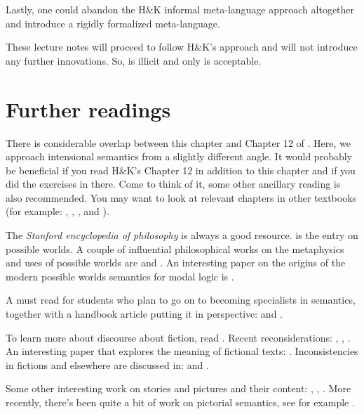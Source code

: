 Lastly, one could abandon the H\&K informal meta-language approach
altogether and introduce a rigidly formalized meta-language.

These lecture notes will proceed to follow H\&K's approach and will not
introduce any further innovations. So,  is illicit and only
 is acceptable.


\section{Further readings}

There is considerable overlap between this chapter and Chapter 12 of
\cite{heim-kratzer-1998-semantics}. Here, we approach intensional semantics from
a slightly different angle. It would probably be beneficial if you read H\&K's
Chapter 12 in addition to this chapter and if you did the exercises in there.
Come to think of it, some other ancillary reading is also recommended. You may
want to look at relevant chapters in other textbooks (for example:
\cite[Chapters 5\&6]{dowty-wall-peters-1981-intro}, \cite[Volume II: Intensional
Logic and Logical Grammar]{gamut:91}, \cite[Chapter 5:
Intensionality]{chierchia-mcconnell-ginet-2000-meaning-grammar}, and
\cite{zimmermann-sternefeld-2013-semantics}).

The \emph{Stanford encyclopedia of philosophy} is always a good resource.
\cite{menzel-2016-sep-possible-worlds} is the entry on possible worlds. A couple
of influential philosophical works on the metaphysics and uses of possible
worlds are \cite{kripke:naming:80} and \cite{lewis-1986-plurality-worlds}. An
interesting paper on the origins of the modern possible worlds semantics for
modal logic is \cite{copeland-2002-genesis}.

A must read for students who plan to go on to becoming specialists in semantics,
together with a handbook article putting it in perspective:
\cite{montague-1973-ptq} and \cite{partee-hendriks-1997-hbll}.

To learn more about discourse about fiction, read \cite{lewis-1978-fiction}.
Recent reconsiderations: \cite{bonomi-zucchi-2003-fiction},
\cite{hanley-2004-lewis-fiction}, \cite{proudfoot-2006-fiction}. An interesting
paper that explores the meaning of fictional texts:
\cite{bauer-beck-2014-fiction}. Inconsistencies in fictions and elsewhere are
discussed in: \cite{varzi-1997-inconsistency} and
\cite{lewis-1982-equivocators}.
  
Some other interesting work on stories and pictures and their content:
\cite{ross-1997-media}, \cite{zucchi-2001-tense-fiction},
\cite{blumson-2009-pictures}. More recently, there's been quite a bit of work on
pictorial semantics, see for example
\cite{abusch-rooth-2017-pictorial,greenberg-2018-pictorial,
  maier-bimpikou-2019-pictorial}.

